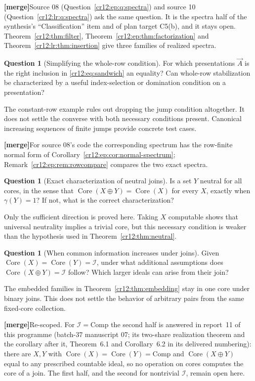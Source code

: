 \documentclass[11pt,letterpaper]{article}
\theoremstyle{plain}
\theoremstyle{definition}
\newtheorem{question}[theorem]{Question}
\theoremstyle{remark}
\numberwithin{equation}{section}
\newcommand{\Core}{\operatorname{Core}}
\newcommand{\Comp}{\mathrm{Comp}}
\newcommand{\I}{\mathcal I}
\newcommand{\mergenote}[1]{\par\smallskip\noindent
 {\small\textsf{\textbf{[merge]}}\enspace #1}\par\smallskip}
\begin{document}
\mergenote{Source 08 (Question~\ref{cr12:ep:q:spectra}) and source 10
(Question~\ref{cr12:lr:q:spectra}) ask the same question. It is the spectra half of
the synthesis's ``Classification'' item and of plan target C5(b), and it stays open.
Theorem~\ref{cr12:thm:filter}, Theorem~\ref{cr12:ep:thm:factorization} and
Theorem~\ref{cr12:lr:thm:insertion} give three families of realized spectra.}

\begin{question}[Simplifying the whole-row condition]\label{cr12:q:rows}
For which presentations $\vec A$ is the right inclusion in
\eqref{cr12:eq:sandwich} an equality? Can whole-row stabilization be characterized
by a useful index-selection or domination condition on a presentation?
\end{question}
The constant-row example rules out dropping the jump condition altogether.
It does not settle the converse with both necessary conditions present.
Canonical increasing sequences of finite jumps provide concrete test cases.

\mergenote{For source 08's code the corresponding spectrum has the row-finite normal
form of Corollary~\ref{cr12:ep:cor:normal-spectrum};
Remark~\ref{cr12:ep:rem:rowcompare} compares the two exact spectra.}

\begin{question}[Exact characterization of neutral joins]\label{cr12:q:neutral}
Is a set $Y$ neutral for all cores, in the sense that
$\Core(X\oplus Y)=\Core(X)$ for every $X$, exactly when $\gamma(Y)=1$?
If not, what is the correct characterization?
\end{question}
Only the sufficient direction is proved here. Taking $X$ computable shows
that universal neutrality implies a trivial core, but this necessary condition
is weaker than the hypothesis used in Theorem~\ref{cr12:thm:neutral}.

\begin{question}[When common information increases under joins]\label{cr12:q:synergy}
Given $\Core(X)=\Core(Y)=\I$, under what additional assumptions does
$\Core(X\oplus Y)=\I$ follow? Which larger ideals can arise from their join?
\end{question}
The embedded families in Theorem~\ref{cr12:thm:embedding} stay in one core under
binary joins. This does not settle the behavior of arbitrary pairs from the
same fixed-core collection.

\mergenote{Re-scoped. For $\I=\Comp$ the second half is answered in report~11 of this
programme (batch-37 manuscript 07; its two-share realization theorem and the
corollary after it, Theorem~6.1 and Corollary~6.2 in its delivered numbering):
there are $X,Y$ with $\Core(X)=\Core(Y)=\Comp$ and $\Core(X\oplus Y)$ equal to any
prescribed countable ideal, so no operation on cores computes the core of a join.
The first half, and the second for nontrivial $\I$, remain open here.}
\end{document}
